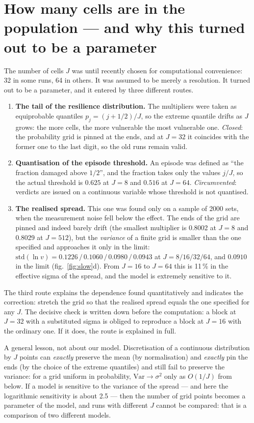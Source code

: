 \section{How many cells are in the population --- and why this turned out to be a parameter}\label{sec:J}
The number of cells $J$ was until recently chosen for computational convenience: 32 in some runs, 64 in others. It was assumed to be merely a resolution. It turned out to be a parameter, and it entered by three different routes.

\begin{enumerate}
\item \textbf{The tail of the resilience distribution.} The multipliers were taken as equiprobable quantiles $p_j=(j+1/2)/J$, so the extreme quantile drifts as $J$ grows: the more cells, the more vulnerable the most vulnerable one. \emph{Closed}: the probability grid is pinned at the ends, and at $J=32$ it coincides with the former one to the last digit, so the old runs remain valid.
\item \textbf{Quantisation of the episode threshold.} An episode was defined as ``the fraction damaged above $1/2$'', and the fraction takes only the values $j/J$, so the actual threshold is $0.625$ at $J=8$ and $0.516$ at $J=64$. \emph{Circumvented}: verdicts are issued on a continuous variable whose threshold is not quantised.
\item \textbf{The realised spread.} This one was found only on a sample of 2000 sets, when the measurement noise fell below the effect. The ends of the grid are pinned and indeed barely drift (the smallest multiplier is 0.8002 at $J=8$ and 0.8029 at $J=512$), but the \emph{variance} of a finite grid is smaller than the one specified and approaches it only in the limit: $\mathrm{std}(\ln v)=0.1226\,/\,0.1060\,/\,0.0980\,/\,0.0943$ at $J=8/16/32/64$, and $0.0910$ in the limit (fig.~\ref{fig:slow}d). From $J=16$ to $J=64$ this is 11\,\% in the effective sigma of the spread, and the model is extremely sensitive to it.
\end{enumerate}

The third route explains the dependence found quantitatively and indicates the correction: stretch the grid so that the realised spread equals the one specified for any $J$. The decisive check is written down before the computation: a block at $J=32$ with a substituted sigma is obliged to reproduce a block at $J=16$ with the ordinary one. If it does, the route is explained in full.

\begin{ineq}
A general lesson, not about our model. Discretisation of a continuous distribution by $J$ points can \emph{exactly} preserve the mean (by normalisation) and \emph{exactly} pin the ends (by the choice of the extreme quantiles) and still fail to preserve the variance: for a grid uniform in probability, $\mathrm{Var}\to\sigma^2$ only as $O(1/J)$ from below. If a model is sensitive to the variance of the spread --- and here the logarithmic sensitivity is about 2.5 --- then the number of grid points becomes a parameter of the model, and runs with different $J$ cannot be compared: that is a comparison of two different models.
\end{ineq}
